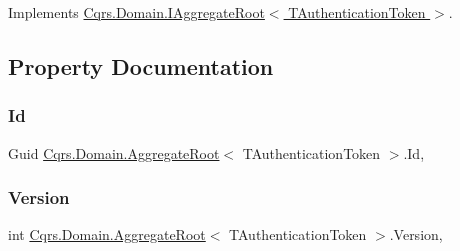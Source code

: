 Implements \hyperlink{interfaceCqrs_1_1Domain_1_1IAggregateRoot_af31116870bbf6566b3eec0b8bc02c6de}{Cqrs.\+Domain.\+I\+Aggregate\+Root$<$ T\+Authentication\+Token $>$}.



\subsection{Property Documentation}
\mbox{\label{classCqrs_1_1Domain_1_1AggregateRoot_ab84d521c8c3bffd3c2e58959984d1e88}} 
\subsubsection{\texorpdfstring{Id}{Id}}
{\footnotesize\ttfamily Guid \hyperlink{classCqrs_1_1Domain_1_1AggregateRoot}{Cqrs.\+Domain.\+Aggregate\+Root}$<$ T\+Authentication\+Token $>$.Id\hspace{0.3cm}{\ttfamily [get]}, {}}

\mbox{\label{classCqrs_1_1Domain_1_1AggregateRoot_a15f351663975c1d8e2cdc37b8c4d970f}} 
\subsubsection{\texorpdfstring{Version}{Version}}
{\footnotesize\ttfamily int \hyperlink{classCqrs_1_1Domain_1_1AggregateRoot}{Cqrs.\+Domain.\+Aggregate\+Root}$<$ T\+Authentication\+Token $>$.Version\hspace{0.3cm}{\ttfamily [get]}, {}}

